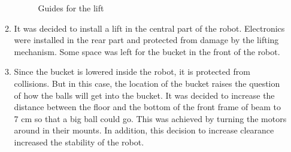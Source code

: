 \begin{enumerate}
\begin{enumerate}
\begin{figure}[H]
\begin{minipage}[h]{0.31\linewidth}
      	\end{minipage}
      	\caption{Guides for the lift}
      \end{figure}
      
      \item It was decided to install a lift in the central part of the robot. Electronics were installed in the rear part and protected from damage by the lifting mechanism. Some space was left for the bucket in the front of the robot. 
       
      \item Since the bucket is lowered inside the robot, it is protected from collisions. But in this case, the location of the bucket raises the question of how the balls will get into the bucket. It was decided to increase the distance between the floor and the bottom of the front frame of beam to 7 cm so that a big ball could go. This was achieved by turning the motors around in their mounts. In addition, this decision to increase clearance increased the stability of the robot.
      

\end{enumerate}
\end{enumerate}
